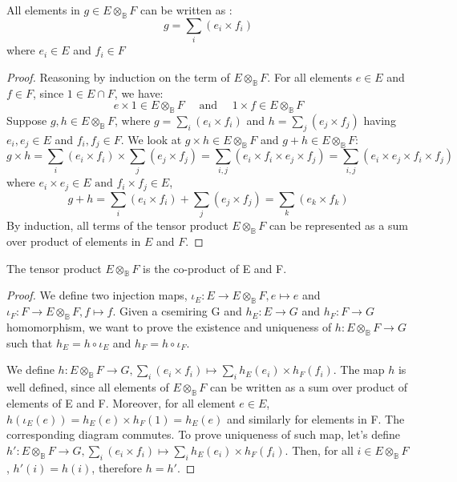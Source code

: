 \begin{lemma}
	All elements in $g \in E \otimes_{\mathbb{B}} F$ can be written as :
	$$
		g = \sum_i (e_i \times f_i)
	$$
	where $e_i \in E$ and $f_i \in F$
\end{lemma}
\begin{proof}
	Reasoning by induction on the term of $E \otimes_{\mathbb{B}} F$. For all elements $e\in E$ and $f\in F$, since $1 \in E \cap F$, we have:
	$$
	e \times 1 \in E \otimes_{\mathbb{B}} F \quad \text{ and } \quad	1 \times f \in E \otimes_{\mathbb{B}} F
	$$
	Suppose $g,h \in E\otimes_{\mathbb{B}} F$, where $g = \sum_i (e_i \times f_i)$ and $h = \sum_j (e_j \times f_j)$ having $e_i,e_j \in E$ and $f_i,f_j \in F$. We look at $g\times h \in E\otimes_{\mathbb{B}} F$ and $g + h \in E\otimes_{\mathbb{B}} F$:
	$$g \times h = \sum_i (e_i \times f_i) \times \sum_j (e_j \times f_j) = \sum_{i,j} (e_i \times f_i \times e_j \times f_j) = \sum_{i,j} (e_i \times e_j \times f_i \times f_j)$$
	where	$e_i \times e_j \in E  \text{ and }  f_i \times f_j \in E$,
	$$ g + h = \sum_i (e_i \times f_i) + \sum_j (e_j \times f_j) = \sum_{k} (e_k \times f_k)$$
	By induction, all terms of the tensor product $E \otimes_{\mathbb{B}} F$ can be represented as a sum over product of elements in $E$ and $F$.
\end{proof}

\begin{theorem}
	The tensor product $E \otimes_{\mathbb{B}} F$ is the co-product of E and F.
\end{theorem}
\begin{proof}
	We define two injection maps, $\iota_E : E \rightarrow E \otimes_{\mathbb{B}} F, e \mapsto e $ and $\iota_F : F \rightarrow E \otimes_{\mathbb{B}} F, f \mapsto f $. Given a csemiring G and $h_E : E \rightarrow G$ and $h_F : F \rightarrow G$ homomorphism, we want to prove the existence and uniqueness of $h : E \otimes_{\mathbb{B}} F \rightarrow G$ such that $h_E = h \circ \iota_E$ and $h_F = h \circ \iota_F$.
	
	We define $h : E \otimes_{\mathbb{B}} F \rightarrow G, \sum_i(e_i \times f_i) \mapsto \sum_i h_E(e_i)\times h_F(f_i)$. The map $h$ is well defined, since all elements of $E \otimes_{\mathbb{B}} F$ can be written as a sum over product of elements of E and F. Moreover, for all element $e\in E$, $h(\iota_E(e))=h_E(e) \times h_F(1) = h_E(e)$ and similarly for elements in F. The corresponding diagram commutes. To prove uniqueness of such map, let's define $h': E \otimes_{\mathbb{B}} F \rightarrow G, \sum_i(e_i \times f_i) \mapsto \sum_i h_E(e_i)\times h_F(f_i)$. Then, for all $i \in E \otimes_{\mathbb{B}} F$, $h'(i) = h(i)$, therefore $h=h'$.
\end{proof}

